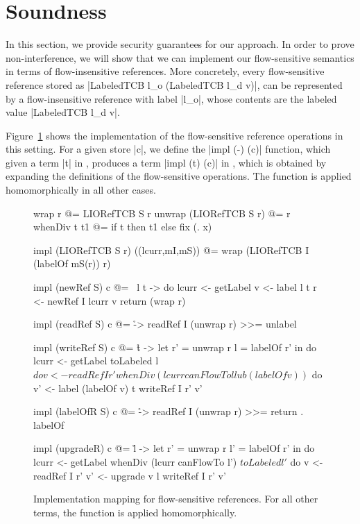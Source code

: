 \section{Soundness}
\label{sec:soundness}

In this section, we provide security guarantees for our approach. In
order to prove non-interference, we will show that we can implement
our flow-sensitive semantics in terms of flow-insensitive
references. More concretely, every flow-sensitive reference stored as
|LabeledTCB l_o (LabeledTCB l_d v)|, can be represented by a
flow-insensitive reference with label |l_o|, whose contents are the
labeled value |LabeledTCB l_d v|.

Figure~\ref{fig:fs-exts-semantics-impl} shows the implementation of
the flow-sensitive reference operations in this setting.  For a given
store |c|, we define the |impl (-) (c)| function, which given a term |t|
in \liofs{}, produces a term |impl (t) (c)| in \lio{}, which is obtained
by expanding the definitions of the flow-sensitive operations. The
function is applied homomorphically in all other cases.

\begin{figure}
\small
\begin{code}
wrap r @= LIORefTCB S r
unwrap (LIORefTCB S r) @= r
whenDiv t t1 @= if t then t1 else fix (\x. x)

impl (LIORefTCB S r) ((lcurr,mI,mS)) @= wrap (LIORefTCB I (labelOf mS(r)) r)

impl (newRef S) c @= \ l t -> do
  lcurr  <- getLabel
  v      <- label l t
  r      <- newRef I lcurr v
  return (wrap r)


impl (readRef S) c @= \r -> readRef I (unwrap r) >>= unlabel


impl (writeRef S) c @= \r t -> let  r'  = unwrap r
                                    l   = labelOf r' in do
  lcurr <- getLabel
  toLabeled l $ do
     v   <- readRef I r'
     whenDiv (lcurr canFlowTo l lub (labelOf v)) $ do
       v'  <- label (labelOf v) t
       writeRef I r' v'


impl (labelOfR S) c @= \r -> readRef I (unwrap r) >>= return . labelOf

impl (upgradeR) c @= \r l -> let  r'  = unwrap r
                                  l'  = labelOf r' in do
  lcurr <- getLabel
  whenDiv (lcurr canFlowTo l') $ toLabeled l' $ do
     v   <- readRef I r'
     v'  <- upgrade v l
     writeRef I r' v'

\end{code}
\caption{Implementation mapping for flow-sensitive references. For all other terms, the function is applied homomorphically.\label{fig:fs-exts-semantics-impl}}
\end{figure}


